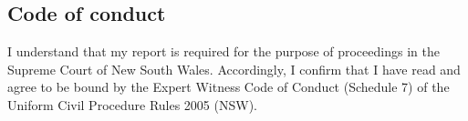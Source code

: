 

\subsection{Code of conduct} %
\begin{myenum}
    \item I understand that my report is required for the purpose of proceedings in the Supreme Court of New South Wales. Accordingly, I confirm that I have read and agree to be bound by the Expert Witness Code of Conduct (Schedule 7) of the Uniform Civil Procedure Rules 2005 (NSW).
\end{myenum}


